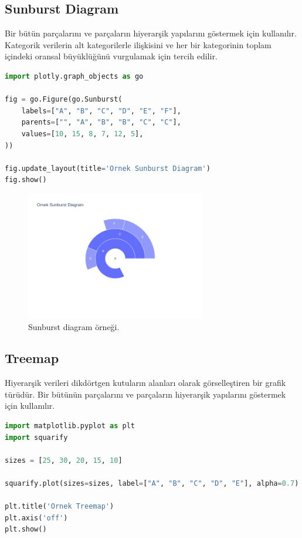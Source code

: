 \newpage

\subsection{Sunburst Diagram}
Bir bütün parçalarını ve parçaların hiyerarşik yapılarını göstermek için kullanılır. Kategorik verilerin alt kategorilerle ilişkisini ve her bir kategorinin toplam içindeki oransal büyüklüğünü vurgulamak için tercih edilir.

\begin{lstlisting}[language=Python]
import plotly.graph_objects as go

fig = go.Figure(go.Sunburst(
    labels=["A", "B", "C", "D", "E", "F"],
    parents=["", "A", "B", "B", "C", "C"],
    values=[10, 15, 8, 7, 12, 5],
))

fig.update_layout(title='Ornek Sunburst Diagram')
fig.show()
\end{lstlisting}

\begin{figure}[h]
    \centering
    \includegraphics[width=0.7\textwidth]{images/sunburst_diagram.png}
    \caption{Sunburst diagram örneği.}
    \label{fig:enter-label}
\end{figure}

\newpage

\subsection{Treemap}
Hiyerarşik verileri dikdörtgen kutuların alanları olarak görselleştiren bir grafik türüdür. Bir bütünün parçalarını ve parçaların hiyerarşik yapılarını göstermek için kullanılır.

\begin{lstlisting}[language=Python]
import matplotlib.pyplot as plt
import squarify

sizes = [25, 30, 20, 15, 10]

squarify.plot(sizes=sizes, label=["A", "B", "C", "D", "E"], alpha=0.7)

plt.title('Ornek Treemap')
plt.axis('off')
plt.show()
\end{lstlisting}

